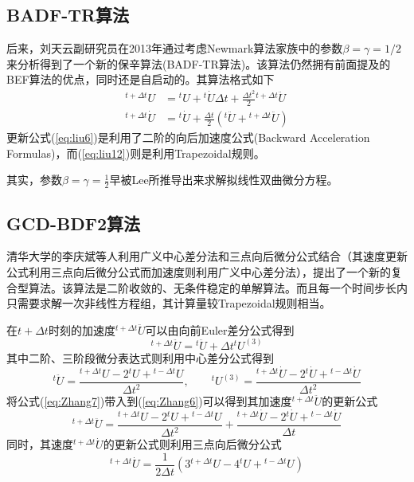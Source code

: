 \subsection{BADF-TR算法}
后来，刘天云副研究员在2013年通过考虑Newmark算法家族\cite{Newmark1959}中的参数$\beta=\gamma=1/2$来分析得到了一个新的保辛算法(BADF-TR算法)\cite{Liu2013}。该算法仍然拥有前面提及的BEF算法的优点，同时还是自启动的。其算法格式如下
\begin{align}
{^{t+\Delta t}\!U}&={^t\!U}+{^{t}\!\dot{U}}\Delta t+\frac{\Delta t^2}{2}{^{t+\Delta t}\!\ddot{U}}\label{eq:liu6}\\
{^{t+\Delta t}\!\dot{U}}&={^t\!\dot{U}}+\frac{\Delta t}{2}({^t\!\ddot{U}}+{^{t+\Delta t}\!\ddot{U}})\label{eq:liu12}
\end{align}
更新公式(\ref{eq:liu6})是利用了二阶的向后加速度公式(Backward Acceleration Formulas)，而(\ref{eq:liu12})则是利用Trapezoidal规则。

其实，参数$\beta=\gamma=\frac{1}{2}$早被Lee所推导出来求解拟线性双曲微分方程\cite{Zienkiewicz1977a,Lees1966}。

\subsection{GCD-BDF2算法}
清华大学的李庆斌等人\cite{Zhang2015a}利用广义中心差分法和三点向后微分公式结合（其速度更新公式利用三点向后微分公式而加速度则利用广义中心差分法），提出了一个新的复合型算法。该算法是二阶收敛的、无条件稳定的单解算法。而且每一个时间步长内只需要求解一次非线性方程组，其计算量较Trapezoidal规则相当。

在$t+\Delta t$时刻的加速度${^{t+\Delta t}\!\ddot{U}}$可以由向前Euler差分公式得到
\begin{equation}
{^{t+\Delta t}\!\ddot{U}}={^t\!\ddot{U}}+\Delta t{^{t}\!U^{(3)}}\label{eq:Zhang6}
\end{equation}
其中二阶、三阶段微分表达式则利用中心差分公式得到
\begin{equation}
{^t\!\ddot{U}}=\frac{{^{t+\Delta t}\!U}-2{^t\!U}+{^{t-\Delta t}\!U}}{\Delta t^2},\qquad {^{t}\!U^{(3)}}=\frac{{^{t+\Delta t}\!\dot{U}}-2{^t\!\dot{U}}+{^{t-\Delta t}\!\dot{U}}}{\Delta t^2}\label{eq:Zhang7}
\end{equation}
将公式(\ref{eq:Zhang7})带入到(\ref{eq:Zhang6})可以得到其加速度${^{t+\Delta t}\!\ddot{U}}$的更新公式
\begin{equation}
{^{t+\Delta t}\!\ddot{U}}=\frac{{^{t+\Delta t}\!U}-2{^t\!U}+{^{t-\Delta t}\!U}}{\Delta t^2}+\frac{{^{t+\Delta t}\!\dot{U}}-2{^t\!\dot{U}}+{^{t-\Delta t}\!\dot{U}}}{\Delta t}\label{eq:ZhangA}
\end{equation}
同时，其速度${^{t+\Delta t}\!\dot{U}}$的更新公式则利用三点向后微分公式
\begin{equation}
{^{t+\Delta t}\!\dot{U}}=\frac{1}{2\Delta t}\left(3{^{t+\Delta t}\!U}-4{^t\!U}+{^{t-\Delta t}\!U}\right)\label{eq:ZhangV}
\end{equation}

